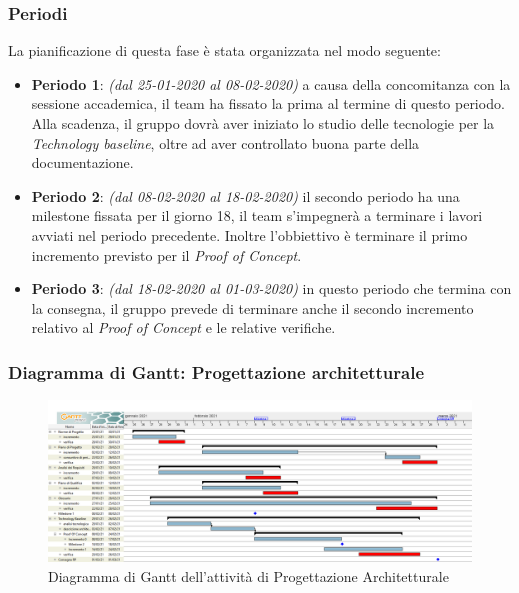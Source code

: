 \subsubsection{Periodi}
La pianificazione di questa fase è stata organizzata nel modo seguente:
\begin{itemize}
\item \textbf{Periodo 1}: \textit{(dal 25-01-2020 al 08-02-2020)} a causa della concomitanza con la sessione accademica, il team ha fissato la prima  al termine di questo periodo. Alla scadenza, il gruppo dovrà aver iniziato lo studio delle tecnologie per la \textit{Technology baseline}, oltre ad aver controllato buona parte della documentazione.

\item \textbf{Periodo 2}: \textit{(dal 08-02-2020 al 18-02-2020)} il secondo periodo ha una milestone fissata per il giorno 18, il team s'impegnerà a terminare i lavori avviati nel periodo precedente. Inoltre l'obbiettivo è terminare il primo incremento previsto per il \textit{Proof of Concept}.

\item \textbf{Periodo 3}: \textit{(dal 18-02-2020 al 01-03-2020)} in questo periodo che termina con la consegna, il gruppo prevede di terminare anche il secondo incremento relativo al \textit{Proof of Concept} e le relative verifiche.
\end{itemize}


\subsubsection{Diagramma di Gantt: Progettazione architetturale}
\begin{figure}[h]
	\centering	
	\includegraphics[scale=0.30]{Images/GanttPianificazioneProgettazioneArchitetturale.PNG}
	\caption{Diagramma di Gantt dell'attività di Progettazione Architetturale}
\end{figure}